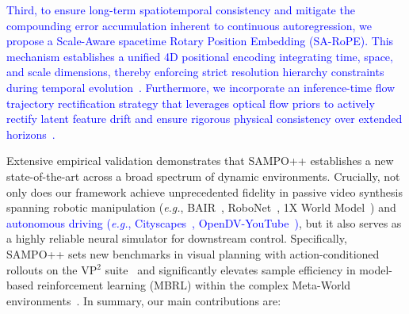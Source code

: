\textcolor{blue}{Third, to ensure long-term spatiotemporal consistency and mitigate the compounding error accumulation inherent to continuous autoregression, we propose a Scale-Aware spacetime Rotary Position Embedding (SA-RoPE). This mechanism establishes a unified 4D positional encoding integrating time, space, and scale dimensions, thereby enforcing strict resolution hierarchy constraints during temporal evolution~\cite{su2024roformer,tian2025pdfactor,yesiltepe2025infinity}. Furthermore, we incorporate an inference-time flow trajectory rectification strategy that leverages optical flow priors to actively rectify latent feature drift and ensure rigorous physical consistency over extended horizons~\cite{teed2020raft, ji2026videoar}.}

Extensive empirical validation demonstrates that SAMPO++ establishes a new state-of-the-art across a broad spectrum of dynamic environments. Crucially, not only does our framework achieve unprecedented fidelity in passive video synthesis spanning robotic manipulation (\textit{e.g.}, BAIR~\cite{ebert2017selfBAIR}, RoboNet~\cite{dasari2019robonet}, 1X World Model~\cite{1X_Technologies_1X_World_Model_2024}) and \textcolor{blue}{autonomous driving (\textit{e.g.}, Cityscapes~\cite{Cityscapes}, OpenDV-YouTube~\cite{yang2024genad})}, but it also serves as a highly reliable neural simulator for downstream control. Specifically, SAMPO++ sets new benchmarks in visual planning with action-conditioned rollouts on the VP$^2$ suite~\cite{tian2023control} and significantly elevates sample efficiency in model-based reinforcement learning (MBRL) within the complex Meta-World environments~\cite{yu2020meta}.
In summary, our main contributions are:
